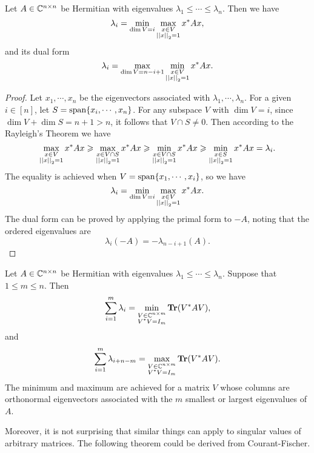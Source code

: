 \documentclass[12pt]{article}
\begin{document}
\begin{theorem}
    Let \(A\in\mathbb C^{n\times n}\) be Hermitian with eigenvalues \(\lambda_1\leqslant\cdots\leqslant\lambda_n\). Then we have
    \[\lambda_i=\min_{\dim V=i}\max_{\substack{x\in V\\\left|\left|x\right|\right|_2=1}}x^\ast Ax,\]
    and its dual form
    \[\lambda_i=\max_{\dim V=n-i+1}\min_{\substack{x\in V\\\left|\left|x\right|\right|_2=1}}x^\ast Ax.\]
\end{theorem}
\begin{proof}
    Let \(x_1,\cdots,x_n\) be the eigenvectors associated with \(\lambda_1,\cdots,\lambda_n\). For a given \(i\in[n]\), let \(S=\operatorname{span}\{x_i,\cdots,x_n\}\). For any subspace \(V\) with \(\dim V=i\), since \(\dim V+\dim S=n+1>n\), it follows that \(V\cap S\neq 0\). Then according to the Rayleigh's Theorem we have
    \[\max_{\substack{x\in V\\\left|\left|x\right|\right|_2=1}}x^\ast Ax\geqslant\max_{\substack{x\in V\cap S\\\left|\left|x\right|\right|_2=1}}x^\ast Ax\geqslant\min_{\substack{x\in V\cap S\\\left|\left|x\right|\right|_2=1}}x^\ast Ax\geqslant\min_{\substack{x\in S\\\left|\left|x\right|\right|_2=1}}x^\ast Ax=\lambda_i.\]
    The equality is achieved when \(V=\operatorname{span}\{x_1,\cdots,x_i\}\), so we have
    \[\lambda_i=\min_{\dim V=i}\max_{\substack{x\in V\\\left|\left|x\right|\right|_2=1}}x^\ast Ax.\]
    The dual form can be proved by applying the primal form to \(-A\), noting that the ordered eigenvalues are
    \[\lambda_i(-A)=-\lambda_{n-i+1}(A).\]
\end{proof}

\begin{theorem}
    Let \(A\in\mathbb C^{n\times n}\) be Hermitian with eigenvalues \(\lambda_1\leqslant\cdots\leqslant\lambda_n\). Suppose that \(1\leqslant m\leqslant n\). Then
    \[\sum_{i=1}^m\lambda_i=\min_{\substack{V\in\mathbb C^{n\times m}\\V^\ast V=I_m}}\operatorname{\mathbf{Tr}}(V^\ast AV),\]
    and
    \[\sum_{i=1}^m\lambda_{i+n-m}=\max_{\substack{V\in\mathbb C^{n\times m}\\V^\ast V=I_m}}\operatorname{\mathbf{Tr}}(V^\ast AV).\]
    The minimum and maximum are achieved for a matrix \(V\) whose columns are orthonormal eigenvectors associated with the \(m\) smallest or largest eigenvalues of \(A\).
\end{theorem}

Moreover, it is not surprising that similar things can apply to singular values of arbitrary matrices. The following theorem could be derived from Courant-Fischer.
\end{document}
